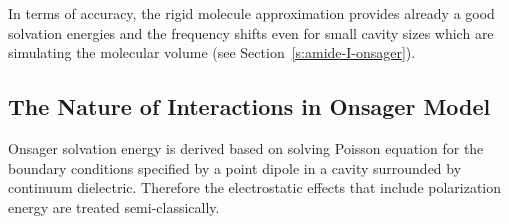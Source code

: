 \documentclass[b5paper,oneside,fleqn,11pt]{book}
\begin{document}
\begin{refsection}
In terms of accuracy, the rigid molecule approximation
provides already a good solvation energies and the frequency shifts
even for small cavity sizes which are simulating the molecular
volume
(see Section~\ref{s:amide-I-onsager}). 

\subsection{The Nature of Interactions in Onsager Model}

Onsager solvation energy is derived based on solving Poisson
equation for the boundary conditions specified by a point
dipole in a cavity surrounded by continuum dielectric.
Therefore the electrostatic effects that include polarization
energy are treated semi\hyp{}classically.


\end{refsection}
\end{document}
